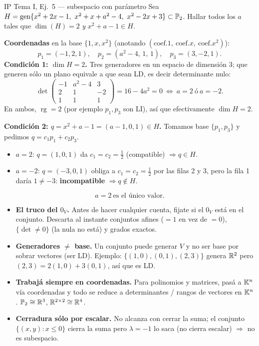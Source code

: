 \begin{ejemplo}{IP Tema I, Ej.\ 5 --- subespacio con parámetro}
Sea $H=\gen\{x^2+2x-1,\ x^2+x+a^2-4,\ x^2-2x+3\}\subset\mathbb{P}_2$. Hallar todos los $a$ tales que $\dim(H)=2$ \emph{y} $x^2+a-1\in H$.

\smallskip
\textbf{Coordenadas} en la base $\{1,x,x^2\}$ (anotando $(\text{coef.}1,\ \text{coef.}x,\ \text{coef.}x^2)$):
\[
p_1=(-1,2,1),\quad p_2=(a^2-4,\,1,\,1),\quad p_3=(3,-2,1).
\]
\textbf{Condición 1: $\dim H=2$.} Tres generadores en un espacio de dimensión $3$; que generen sólo un plano equivale a que sean LD, es decir determinante nulo:
\[
\det\begin{pmatrix}-1&a^2-4&3\\ 2&1&-2\\ 1&1&1\end{pmatrix}=16-4a^2=0\ \iff\ a=2\ \text{ó}\ a=-2.
\]
En ambos, $\operatorname{rg}=2$ (por ejemplo $p_1,p_3$ son LI), así que efectivamente $\dim H=2$.

\smallskip
\textbf{Condición 2: $q=x^2+a-1=(a-1,0,1)\in H$.} Tomamos base $\{p_1,p_3\}$ y pedimos $q=c_1p_1+c_2p_3$.
\begin{itemize}
\item $a=2$: $q=(1,0,1)$ da $c_1=c_2=\tfrac12$ (compatible) $\Rightarrow q\in H$. \checkmark
\item $a=-2$: $q=(-3,0,1)$ obliga a $c_1=c_2=\tfrac12$ por las filas 2 y 3, pero la fila 1 daría $1\neq-3$: \textbf{incompatible} $\Rightarrow q\notin H$.
\end{itemize}
\[
\boxed{a=2\ \text{es el único valor}.}
\]
\end{ejemplo}

\begin{truco}
\begin{itemize}
\item \textbf{El truco del $0_V$.} Antes de hacer cualquier cuenta, fijate si el $0_V$ está en el conjunto. Descarta al instante conjuntos afines ($=1$ en vez de $=0$), $\{\det\neq0\}$ (la nula no está) y grados exactos.
\item \textbf{Generadores $\neq$ base.} Un conjunto puede generar $V$ y no ser base por sobrar vectores (ser LD). Ejemplo: $\{(1,0),(0,1),(2,3)\}$ genera $\mathbb{R}^2$ pero $(2,3)=2(1,0)+3(0,1)$, así que es LD.
\item \textbf{Trabajá siempre en coordenadas.} Para polinomios y matrices, pasá a $\mathbb{K}^n$ vía coordenadas y todo se reduce a determinantes / rangos de vectores en $\mathbb{K}^n$. $\mathbb{P}_2\cong\mathbb{R}^3$, $\mathbb{R}^{2\times2}\cong\mathbb{R}^4$.
\item \textbf{Cerradura sólo por escalar.} No alcanza con cerrar la suma; el conjunto $\{(x,y):x\le0\}$ cierra la suma pero $\lambda=-1$ lo saca (no cierra escalar) $\Rightarrow$ no es subespacio.
\end{itemize}
\end{truco}


